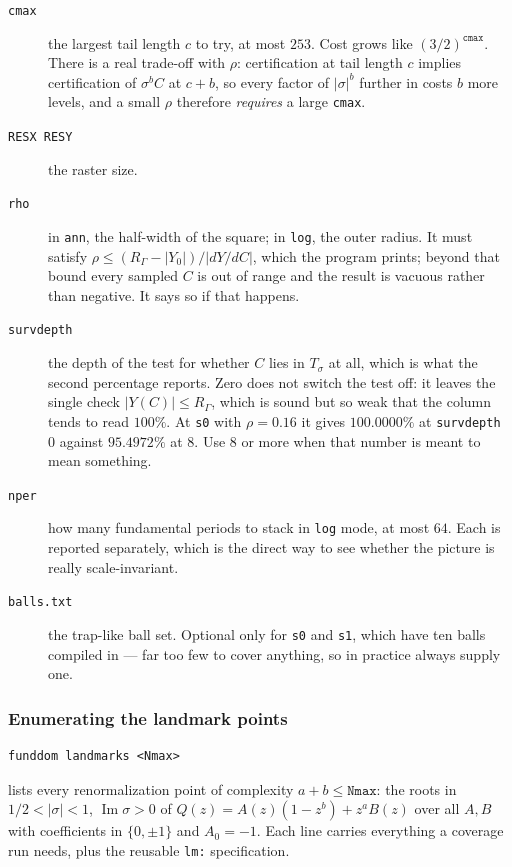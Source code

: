 \documentclass{amsart}
\begin{document}
\begin{description}
\item[\texttt{cmax}] the largest tail length $c$ to try, at most $253$.  Cost grows like
$(3/2)^{\texttt{cmax}}$.  There is a real trade-off with $\rho$: certification at tail length $c$
implies certification of $\sigma^b C$ at $c + b$, so every factor of $|\sigma|^b$ further in costs
$b$ more levels, and a small $\rho$ therefore \emph{requires} a large \texttt{cmax}.
\item[\texttt{RESX RESY}] the raster size.
\item[\texttt{rho}] in \texttt{ann}, the half-width of the square; in \texttt{log}, the outer
radius.  It must satisfy $\rho \le (R_\Gamma - |Y_0|)/|dY/dC|$, which the program prints; beyond
that bound every sampled $C$ is out of range and the result is vacuous rather than negative.  It
says so if that happens.
\item[\texttt{survdepth}] the depth of the test for whether $C$ lies in $T_\sigma$ at all, which
is what the second percentage reports.  Zero does not switch the test off: it leaves the single
check $|Y(C)| \le R_\Gamma$, which is sound but so weak that the column tends to read
$100\%$.  At \texttt{s0} with $\rho = 0.16$ it gives $100.0000\%$ at \texttt{survdepth} $0$
against $95.4972\%$ at $8$.  Use $8$ or more when that number is meant to mean something.
\item[\texttt{nper}] how many fundamental periods to stack in \texttt{log} mode, at most $64$.
Each is reported separately, which is the direct way to see whether the picture is really
scale-invariant.
\item[\texttt{balls.txt}] the trap-like ball set.  Optional only for \texttt{s0} and \texttt{s1},
which have ten balls compiled in --- far too few to cover anything, so in practice always supply
one.
\end{description}

\subsubsection{Enumerating the landmark points}

\begin{verbatim}
funddom landmarks <Nmax>
\end{verbatim}

lists every renormalization point of complexity $a + b \le \texttt{Nmax}$: the roots in
$1/2 < |\sigma| < 1$, $\operatorname{Im}\sigma > 0$ of $Q(z) = A(z)(1-z^b) + z^aB(z)$ over all
$A, B$ with coefficients in $\{0,\pm1\}$ and $A_0 = -1$.  Each line carries everything a coverage
run needs, plus the reusable \texttt{lm:} specification.
\end{document}
